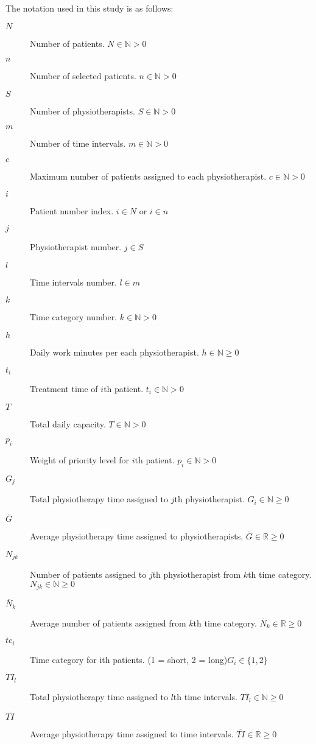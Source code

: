 \documentclass[a4paper,12pt]{article}
\begin{document}
The notation used in this study is as follows:
\begin{description}
	\item[$N$] Number of patients. $N \in \mathbb{N} > 0$
	\item[$n$] Number of selected patients. $n \in \mathbb{N} > 0$
	\item[$S$] Number of physiotherapists. $S \in \mathbb{N} > 0$
	\item[$m$] Number of time intervals. $m \in \mathbb{N} > 0$
	\item[$c$] Maximum number of patients assigned to each physiotherapist. $c \in \mathbb{N} > 0$
	\item[$i$] Patient number index. $i \in N$ or $i \in n$
	\item[$j$] Physiotherapist number. $j \in S$
	\item[$l$] Time intervals number. $l \in m$
	\item[$k$] Time category number. $k \in  \mathbb{N} > 0$
	\item[$h$] Daily work minutes per each physiotherapist. $h \in  \mathbb{N} \ge 0$
	\item[$t_i$] Treatment time of $i$th patient. $t_i \in  \mathbb{N} > 0$
	\item[$T$] Total daily capacity. $T \in  \mathbb{N} > 0$
	\item[$p_i$] Weight of priority level for $i$th patient. $p_i \in  \mathbb{N} > 0$
	\item[$G_j$] Total physiotherapy time assigned to $j$th physiotherapist. $G_i \in  \mathbb{N} \ge 0$
	\item[$\overline{G}$] Average physiotherapy time assigned to physiotherapists. $\overline{G} \in  \mathbb{R} \ge 0$
	\item[$N_{jk}$] Number of patients assigned to $j$th physiotherapist from $k$th time category. $N_{jk} \in  \mathbb{N} \ge 0$
	\item[$\overline{N}_k$] Average number of patients assigned from $k$th time category. $\overline{N}_k \in  \mathbb{R} \ge 0$
	\item[$tc_i$] Time category for ith patients. (1 = short, 2 = long)$G_i \in \{1, 2\}$
	\item[$TI_l$] Total physiotherapy time assigned to $l$th time intervals. $TI_l \in  \mathbb{N} \ge 0$
	\item[$\overline{TI}$] Average physiotherapy time assigned to time intervals. $\overline{TI} \in  \mathbb{R} \ge 0$
\end{description}
\end{document}
